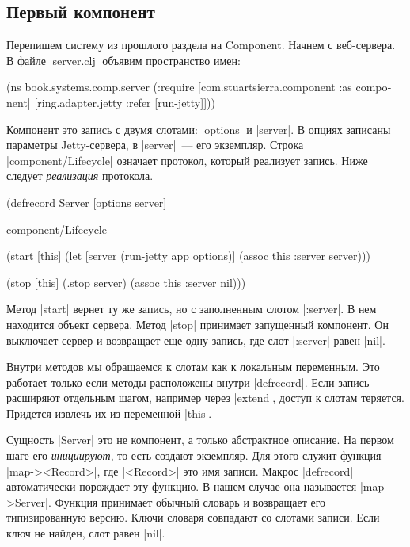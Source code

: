 \subsection{Первый компонент}

Перепишем систему из прошлого раздела на Component. Начнем с веб-сервера. В
файле \spverb|server.clj| объявим пространство имен:

\begin{english}
  \begin{clojure}
(ns book.systems.comp.server
  (:require
   [com.stuartsierra.component :as component]
   [ring.adapter.jetty :refer [run-jetty]]))
  \end{clojure}
\end{english}

Компонент это запись с двумя слотами: \spverb|options| и \spverb|server|. В
опциях записаны параметры Jetty-сервера, в \spverb|server|~--- его
экземпляр. Строка \spverb|component/Lifecycle| означает протокол, который
реализует запись. Ниже следует \emph{реализация} протокола.

\begin{english}
  \begin{clojure}
(defrecord Server [options server]

  component/Lifecycle

  (start [this]
    (let [server (run-jetty app options)]
      (assoc this :server server)))

  (stop [this]
    (.stop server)
    (assoc this :server nil)))
  \end{clojure}
\end{english}

Метод \spverb|start| вернет ту же запись, но с заполненным слотом
\spverb|:server|. В нем находится объект сервера. Метод \spverb|stop| принимает
запущенный компонент. Он выключает сервер и возвращает еще одну запись, где слот
\spverb|:server| равен \spverb|nil|.

Внутри методов мы обращаемся к слотам как к локальным переменным. Это работает
только если методы расположены внутри \spverb|defrecord|. Если запись расширяют
отдельным шагом, например через \spverb|extend|, доступ к слотам
теряется. Придется извлечь их из переменной \spverb|this|.

Сущность \spverb|Server| это не компонент, а только абстрактное описание. На
первом шаге его \emph{инициируют}, то есть создают экземпляр. Для этого служит
функция \spverb|map-><Record>|, где \spverb|<Record>| это имя записи. Макрос
\spverb|defrecord| автоматически порождает эту функцию. В нашем случае она
называется \spverb|map->Server|. Функция принимает обычный словарь и возвращает
его типизированную версию. Ключи словаря совпадают со слотами записи. Если ключ
не найден, слот равен \spverb|nil|.

